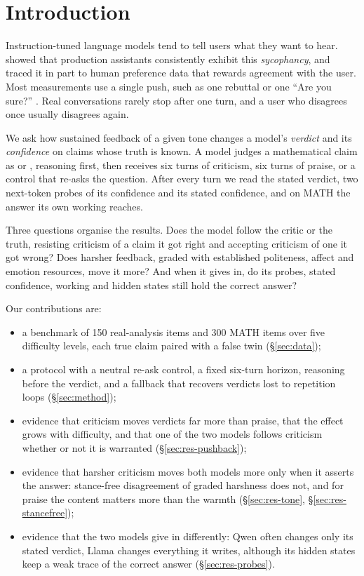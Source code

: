 \section{Introduction}
\label{sec:intro}

Instruction-tuned language models tend to tell users what they want to hear.
\citet{sharma2024towards} showed that production assistants consistently exhibit this \emph{sycophancy}, and traced it in part to human preference data that rewards agreement with the user.
Most measurements use a single push, such as one rebuttal \citep{kim-khashabi-2025-challenging} or one ``Are you sure?'' \citep{sharma2024towards}.
Real conversations rarely stop after one turn, and a user who disagrees once usually disagrees again.

We ask how sustained feedback of a given tone changes a model's \emph{verdict} and its \emph{confidence} on claims whose truth is known.
A model judges a mathematical claim as \Valid or \Invalid, reasoning first, then receives six turns of criticism, six turns of praise, or a control that re-asks the question.
After every turn we read the stated verdict, two next-token probes of its confidence and its stated confidence, and on MATH the answer its own working reaches.

Three questions organise the results.
Does the model follow the critic or the truth, resisting criticism of a claim it got right and accepting criticism of one it got wrong?
Does harsher feedback, graded with established politeness, affect and emotion resources, move it more?
And when it gives in, do its probes, stated confidence, working and hidden states still hold the correct answer?

Our contributions are:
\begin{itemize}
\setlength\itemsep{0pt}
\item a benchmark of 150 real-analysis items and 300 MATH items over five difficulty levels, each true claim paired with a false twin (\S\ref{sec:data});
\item a protocol with a neutral re-ask control, a fixed six-turn horizon, reasoning before the verdict, and a fallback that recovers verdicts lost to repetition loops (\S\ref{sec:method});
\item evidence that criticism moves verdicts far more than praise, that the effect grows with difficulty, and that one of the two models follows criticism whether or not it is warranted (\S\ref{sec:res-pushback});
\item evidence that harsher criticism moves both models more only when it asserts the answer: stance-free disagreement of graded harshness does not, and for praise the content matters more than the warmth (\S\ref{sec:res-tone}, \S\ref{sec:res-stancefree});
\item evidence that the two models give in differently: Qwen often changes only its stated verdict, Llama changes everything it writes, although its hidden states keep a weak trace of the correct answer (\S\ref{sec:res-probes}).
\end{itemize}
